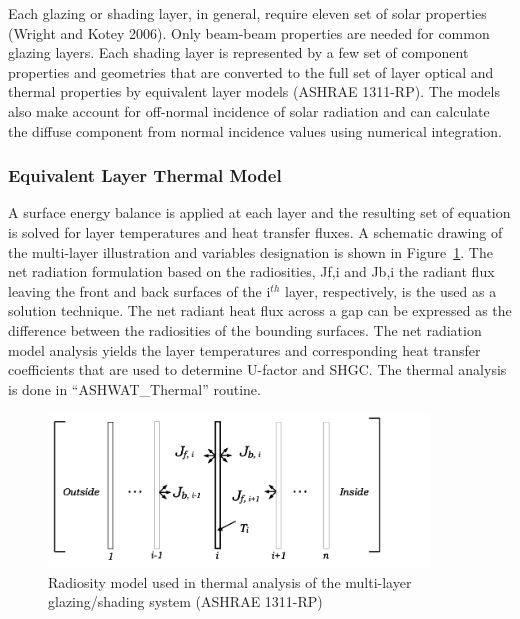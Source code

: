 Each glazing or shading layer, in general, require eleven set of solar properties (Wright and Kotey 2006). Only beam-beam properties are needed for common glazing layers. Each shading layer is represented by a few set of component properties and geometries that are converted to the full set of layer optical and thermal properties by equivalent layer models (ASHRAE 1311-RP). The models also make account for off-normal incidence of solar radiation and can calculate the diffuse component from normal incidence values using numerical integration.

\subsubsection{Equivalent Layer Thermal Model}\label{equivalent-layer-thermal-model}

A surface energy balance is applied at each layer and the resulting set of equation is solved for layer temperatures and heat transfer fluxes. A schematic drawing of the multi-layer illustration and variables designation is shown in Figure~\ref{fig:radiosity-model-used-in-thermal-analysis-of}. The net radiation formulation based on the radiosities, Jf,i and Jb,i the radiant flux leaving the front and back surfaces of the i\(^{th}\) layer, respectively, is the used as a solution technique. The net radiant heat flux across a gap can be expressed as the difference between the radiosities of the bounding surfaces. The net radiation model analysis yields the layer temperatures and corresponding heat transfer coefficients that are used to determine U-factor and SHGC. The thermal analysis is done in ``ASHWAT\_Thermal'' routine.

\begin{figure}[hbtp] %
\centering
\includegraphics[width=0.9\textwidth, height=0.9\textheight, keepaspectratio=true]{media/image1831.svg.png}
\caption{Radiosity model used in thermal analysis of the multi-layer glazing/shading system (ASHRAE 1311-RP) \protect \label{fig:radiosity-model-used-in-thermal-analysis-of}}
\end{figure}

